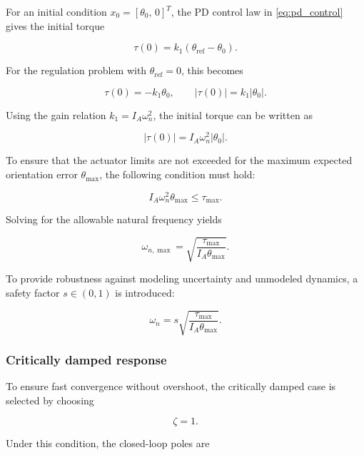 \documentclass[journal]{IEEEtran}
\begin{document}
For an initial condition $x_0 = [\theta_0,\,0]^T$, the PD control law in \eqref{eq:pd_control} gives the initial torque

\begin{equation}
\tau(0) = k_1 (\theta_{\mathrm{ref}} - \theta_0).
\end{equation}

For the regulation problem with $\theta_{\mathrm{ref}} = 0$, this becomes

\begin{equation}
\tau(0) = -k_1 \theta_0,
\qquad
|\tau(0)| = k_1 |\theta_0|.
\end{equation}

Using the gain relation $k_1 = I_A \omega_n^2$, the initial torque can be written as

\begin{equation}
|\tau(0)| = I_A \omega_n^2 |\theta_0|.
\end{equation}

To ensure that the actuator limits are not exceeded for the maximum expected orientation error $\theta_{\max}$, the following condition must hold:

\begin{equation}
I_A \omega_n^2 \theta_{\max} \le \tau_{\max}.
\end{equation}

Solving for the allowable natural frequency yields

\begin{equation}
\omega_{n,\max} = \sqrt{\frac{\tau_{\max}}{I_A \theta_{\max}}}.
\end{equation}

To provide robustness against modeling uncertainty and unmodeled dynamics, a safety factor $s \in (0,1)$ is introduced:

\begin{equation}
\omega_n = s \sqrt{\frac{\tau_{\max}}{I_A \theta_{\max}}}.
\end{equation}
\subsubsection{Critically damped response}

To ensure fast convergence without overshoot, the critically damped case is selected by choosing

\begin{equation}
\zeta = 1.
\end{equation}

Under this condition, the closed-loop poles are
\end{document}
